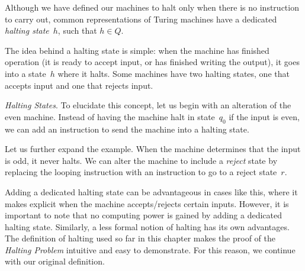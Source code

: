 \documentclass[../../../include/open-logic-section]{subfiles}
\begin{document}

\begin{explain}
Although we have defined our machines to halt only when there
is no instruction to carry out, common representations of Turing
machines have a dedicated \emph{halting state}~$h$, such that
$h \in Q$.

The idea behind a halting state is simple: when the machine has
finished operation (it is ready to accept input, or has finished
writing the output), it goes into a state~$h$ where it halts. Some
machines have two halting states, one that accepts input and one that
rejects input.
\end{explain}

\begin{ex}\emph{Halting States}.
To elucidate this concept, let us begin with an alteration of the
even machine. Instead of having the machine halt in state~$q_0$
if the input is even, we can add an instruction to send the machine
into a halting state.
\begin{center}
\end{center}
Let us further expand the example. When the machine determines that the input
is odd, it never halts. We can alter the machine to
include a \emph{reject} state by replacing the looping instruction with an
instruction to go to a reject state~$r$.
\begin{center}
\end{center}
\end{ex}

\begin{explain}
Adding a dedicated halting state can be advantageous in cases like
this, where it makes explicit when the machine accepts/rejects certain
inputs.  However, it is important to note that no computing power is
gained by adding a dedicated halting state. Similarly, a less
formal notion of halting has its own advantages. The definition of
halting used so far in this chapter makes the proof of the
\emph{Halting Problem} intuitive and easy to demonstrate. For this
reason, we continue with our original definition.
\end{explain}
\end{document}
